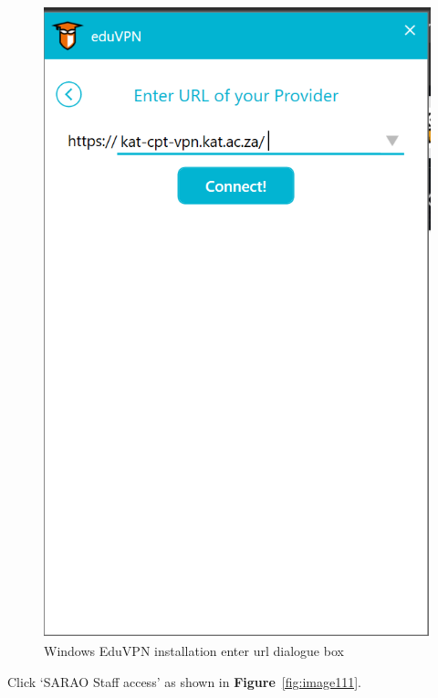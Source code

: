 \begin{figure}[H]
	\centering
	\includegraphics[scale=0.3]{Chapters/images/image69.png}
	
	\caption{Windows EduVPN installation enter url dialogue box }
	\label{fig:image69}
\end{figure}
Click ‘SARAO Staff access’  as shown in \textbf{Figure}~\ref{fig:image111}.
